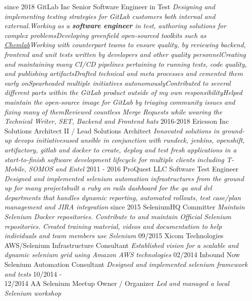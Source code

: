 \documentclass[]{ddavison-resume}
\begin{document}
\begin{entrylist}
 \entry
 		{since 2018}
 		{GitLab Inc}
 		{Senior Software Engineer in Test}
 		{\emph{Designing and implementing testing strategies for GitLab customers both internal and external.\bullet Working as a \textbf{software engineer} in test,  authoring solutions for complex problems\bullet Developing greenfield open-sourced toolkits such as \href{https://gitlab.com/gitlab-org/quality/chemlab}{Chemlab}\bullet Working with counterpart teams to ensure quality, by reviewing backend, frontend and unit tests written by developers and other quality personnel\bullet Creating and maintaining many CI/CD pipelines pertaining to running tests, code quality, and publishing artifacts\bullet Drafted technical and meta processes and cemented them early on\bullet Spearheaded multiple initiatives autonomously\bullet Contributed to several different parts within the GitLab product outside of my own responsibility\bullet Helped maintain the open-source image for GitLab by triaging community issues and fixing many of them\bullet Reviewed countless Merge Requests while wearing the Technical Writer, SET, Backend and Frontend hats}}
  \entry
         {2016-2018}
         {Ericsson Inc}
         {Solutions Architect II / Lead Solutions Architect}
         {\emph{Innovated solutions in ground-up devops initiatives\bullet used ansible in conjunction with rundeck, jenkins, openshift, artifactory, gitlab and docker to create, deploy and test fresh applications in a start-to-finish software development lifecycle for multiple clients including T-Mobile, SOMOS and Entel}}
  \entry
  	{2011 - 2016}
  	{ProQuest LLC}
  	{Software Test Engineer}
  	{\emph{Designed and implemented selenium automation infrastructures from the ground up for many projects\bullet built a ruby on rails dashboard for the qa and dvl departments that handles dynamic reporting, automated rollouts, test case/plan management and JIRA integration}} 
  \entry
  	{since 2015}
  	{SeleniumHQ}
  	{Committer}
  	{\emph{Maintain Selenium Docker repositories.  Contribute to and maintain Official Selenium repositories. Created training material, videos and documentation to help individuals and team members use Selenium}}
  \entry
  	{09/2015}
  	{Xicom Technologies}
  	{AWS/Selenium Infrastructure Consultant}
  	{\emph{Established vision for a scalable and dynamic selenium grid using Amazon AWS technologies}}
  \entry
  	{02/2014}
  	{Inbound Now}
  	{Selenium Automation Consultant}
  	{\emph{Designed and implemented selenium framework and tests}}
  \entry
  	{10/2014 - \\
  	12/2014}
  	{AA Selenium Meetup}
  	{Owner / Organizer}
  	{\emph{Led and managed a local Selenium workshop}}
\end{entrylist}
\end{document}
